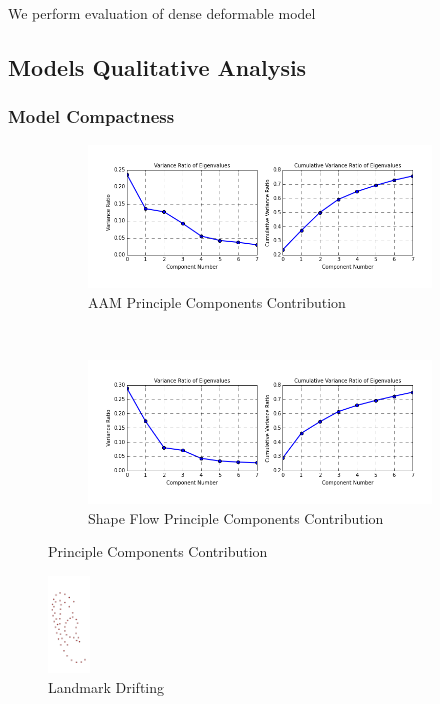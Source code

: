 We perform evaluation of dense deformable model
\subsection{Models Qualitative Analysis}


\subsubsection{Model Compactness}

\begin{figure}[h!]
    \centering
    \begin{subfigure}[b]{0.2\textwidth}
            \includegraphics[width=\textwidth]{resources/aam_ear_eigen_value}
        \caption{AAM Principle Components Contribution}
        \label{}
    \end{subfigure}
    ~~
    \begin{subfigure}[b]{0.2\textwidth}
            \includegraphics[width=\textwidth]{resources/of_ear_eigen_value}
        \caption{Shape Flow Principle Components Contribution}
    \end{subfigure}
    \caption{Principle Components Contribution}
\end{figure}

\begin{figure}[h!]
    \centering
    \includegraphics[width=0.1\textwidth]{resources/landmark_drifting}
    \caption{Landmark Drifting}
\end{figure}

